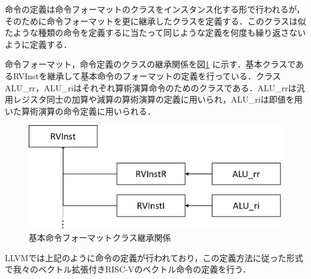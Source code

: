 命令の定義は命令フォーマットのクラスをインスタンス化する形で行われるが，そのために命令フォーマットを更に継承したクラスを定義する．このクラスは似たような種類の命令を定義するに当たって同じような定義を何度も繰り返さないように定義する．

命令フォーマット，命令定義のクラスの継承関係を図\ref{fig:InstFromat_class}%
に示す．基本クラスであるRVInstを継承して基本命令のフォーマットの定義を行っている．クラスALU\_rr，ALU\_riはそれぞれ算術演算命令のためのクラスである．ALU\_rrは汎用レジスタ同士の加算や減算の算術演算の定義に用いられ，ALU\_riは即値を用いた算術演算の命令定義に用いられる．

\begin{figure}[tb]
    \centering
    \includegraphics[scale=0.5]{image/InstFormat_class.pdf}
    \caption{基本命令フォーマットクラス継承関係}
    \label{fig:InstFromat_class}
\end{figure}

LLVMでは上記のように命令の定義が行われており，この定義方法に従った形式で我々のベクトル拡張付きRISC-Vのベクトル命令の定義を行う．
